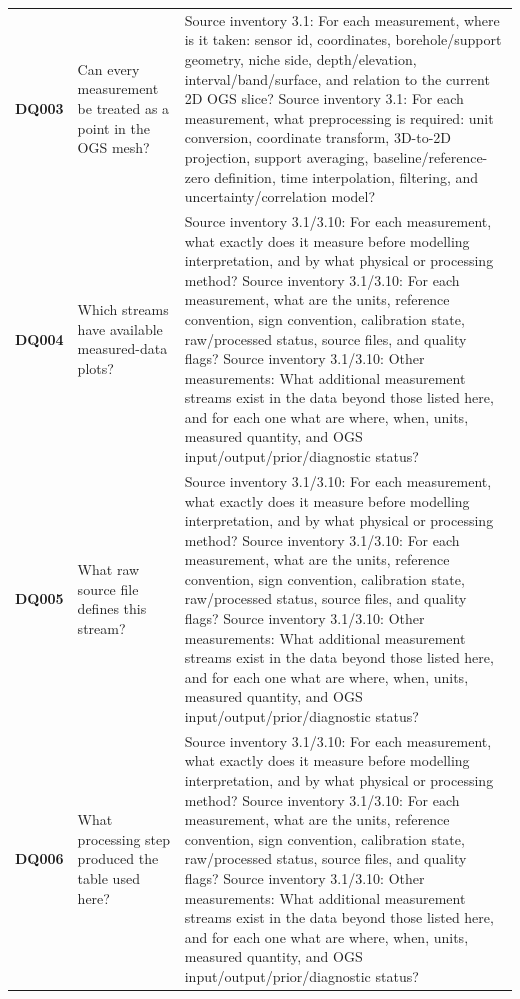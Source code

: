 \begin{longtable}{@{}L{0.09\textwidth} L{0.31\textwidth} L{0.52\textwidth}@{}}
\addlinespace[0.18em]
\textbf{DQ003} & Can every measurement be treated as a point in the OGS mesh? & Source inventory 3.1: For each measurement, where is it taken: sensor id, coordinates, borehole/support geometry, niche side, depth/elevation, interval/band/surface, and relation to the current 2D OGS slice? Source inventory 3.1: For each measurement, what preprocessing is required: unit conversion, coordinate transform, 3D-to-2D projection, support averaging, baseline/reference-zero definition, time interpolation, filtering, and uncertainty/correlation model?\\
\addlinespace[0.18em]
\textbf{DQ004} & Which streams have available measured-data plots? & Source inventory 3.1/3.10: For each measurement, what exactly does it measure before modelling interpretation, and by what physical or processing method? Source inventory 3.1/3.10: For each measurement, what are the units, reference convention, sign convention, calibration state, raw/processed status, source files, and quality flags? Source inventory 3.1/3.10: Other measurements: What additional measurement streams exist in the data beyond those listed here, and for each one what are where, when, units, measured quantity, and OGS input/output/prior/diagnostic status?\\
\addlinespace[0.18em]
\textbf{DQ005} & What raw source file defines this stream? & Source inventory 3.1/3.10: For each measurement, what exactly does it measure before modelling interpretation, and by what physical or processing method? Source inventory 3.1/3.10: For each measurement, what are the units, reference convention, sign convention, calibration state, raw/processed status, source files, and quality flags? Source inventory 3.1/3.10: Other measurements: What additional measurement streams exist in the data beyond those listed here, and for each one what are where, when, units, measured quantity, and OGS input/output/prior/diagnostic status?\\
\addlinespace[0.18em]
\textbf{DQ006} & What processing step produced the table used here? & Source inventory 3.1/3.10: For each measurement, what exactly does it measure before modelling interpretation, and by what physical or processing method? Source inventory 3.1/3.10: For each measurement, what are the units, reference convention, sign convention, calibration state, raw/processed status, source files, and quality flags? Source inventory 3.1/3.10: Other measurements: What additional measurement streams exist in the data beyond those listed here, and for each one what are where, when, units, measured quantity, and OGS input/output/prior/diagnostic status?\\

\end{longtable}
